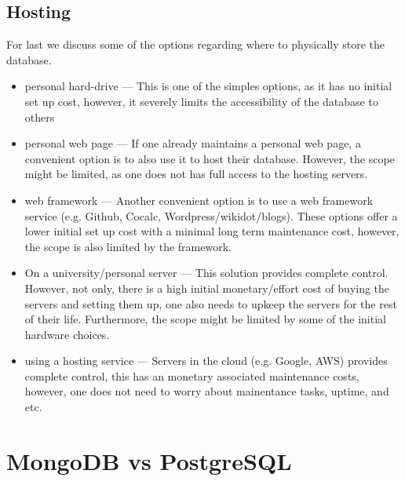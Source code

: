\documentclass{article}
\begin{document}
\subsection{Hosting}


For last we discuss some of the options regarding where to physically store the database.

\begin{itemize}
  \item personal hard-drive
    ---
    This is one of the simples options, as it has no initial set up cost,
    however, it severely limits the accessibility of the database to others
  \item personal web page
    ---
    If one already maintains a personal web page, a convenient option is to also use it to host their database.
    However, the scope might be limited, as one does not has full access to the hosting servers.
  \item web framework
    ---
    Another convenient option is to use a web framework service (e.g. Github, Cocalc, Wordpress/wikidot/blogs).
    These options offer a lower initial set up cost with a minimal long term maintenance cost, however, the scope is also limited by the framework.
  \item On a university/personal server
    ---
    This solution provides complete control.
    However, not only, there is a high initial monetary/effort cost of buying the servers and setting them up, one also needs to upkeep the servers for the rest of their life.
    Furthermore, the scope might be limited by some of the initial hardware choices.
  \item using a hosting service
    ---
    Servers in the cloud (e.g. Google, AWS) provides complete control, this has an monetary associated maintenance costs, however, one does not need to worry about mainentance tasks, uptime, and etc.
\end{itemize}






\section{MongoDB vs PostgreSQL}
\label{sec:MvsP}
\end{document}
